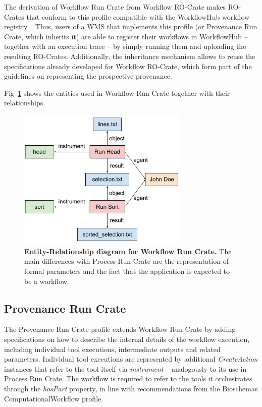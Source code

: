 \documentclass[10pt,letterpaper]{article}
\begin{document}
The derivation of Workflow Run Crate from Workflow RO-Crate makes RO-Crates that conform to this profile compatible with the WorkflowHub workflow registry~\cite{Goble 2021}.
Thus, users of a WMS that implements this profile (or Provenance Run Crate, which inherits it) are able to register their workflows in WorkflowHub -- together with an execution trace -- by simply running them and uploading the resulting RO-Crates.
Additionally, the inheritance mechanism allows to reuse the specifications already developed for Workflow RO-Crate, which form part of the guidelines on representing the prospective provenance.

Fig~\ref{fig:workflow_crate_er} shows the entities used in Workflow Run Crate together with their relationships.

\begin{figure}[!h]
\includegraphics[width=22em]{image3.png}
\caption{{\bf Entity-Relationship diagram for Workflow Run Crate.}
The main differences with Process Run Crate are the representation of formal parameters and the fact that the application is expected to be a workflow.}
\label{fig:workflow_crate_er}
\end{figure}


\subsection{Provenance Run Crate}\label{provenance-run-crate}

The Provenance Run Crate profile extends Workflow Run Crate by adding specifications on how to describe the internal details of the workflow execution, including individual tool executions, intermediate outputs and related parameters.
Individual tool executions are represented by additional \emph{CreateAction} instances that refer to the tool itself via \emph{instrument} -- analogously to its use in Process Run Crate.
The workflow is required to refer to the tools it orchestrates through the \emph{hasPart} property, in line with recommendations from the Bioschemas ComputationalWorkflow profile.
\end{document}
